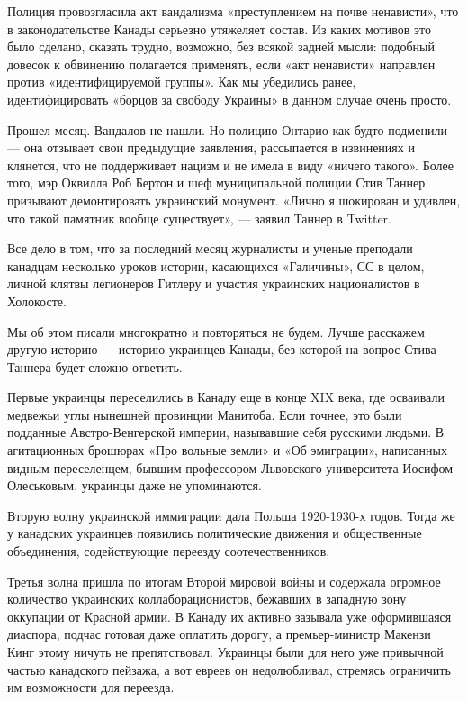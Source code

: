 Полиция провозгласила акт вандализма «преступлением на почве ненависти», что в
законодательстве Канады серьезно утяжеляет состав. Из каких мотивов это было
сделано, сказать трудно, возможно, без всякой задней мысли: подобный довесок к
обвинению полагается применять, если «акт ненависти» направлен против
«идентифицируемой группы». Как мы убедились ранее, идентифицировать «борцов за
свободу Украины» в данном случае очень просто.

Прошел месяц. Вандалов не нашли. Но полицию Онтарио как будто подменили --- она
отзывает свои предыдущие заявления, рассыпается в извинениях и клянется, что не
поддерживает нацизм и не имела в виду «ничего такого». Более того, мэр Оквилла
Роб Бертон и шеф муниципальной полиции Стив Таннер призывают демонтировать
украинский монумент. «Лично я шокирован и удивлен, что такой памятник вообще
существует», --- заявил Таннер в Twitter.

Все дело в том, что за последний месяц журналисты и ученые преподали канадцам
несколько уроков истории, касающихся «Галичины», СС в целом, личной клятвы
легионеров Гитлеру и участия украинских националистов в Холокосте.

Мы об этом писали многократно и повторяться не будем. Лучше расскажем другую
историю --- историю украинцев Канады, без которой на вопрос Стива Таннера будет
сложно ответить.

Первые украинцы переселились в Канаду еще в конце XIX века, где осваивали
медвежьи углы нынешней провинции Манитоба. Если точнее, это были подданные
Австро-Венгерской империи, называвшие себя русскими людьми. В агитационных
брошюрах «Про вольные земли» и «Об эмиграции», написанных видным переселенцем,
бывшим профессором Львовского университета Иосифом Олеськовым, украинцы даже не
упоминаются.

Вторую волну украинской иммиграции дала Польша 1920-1930-х годов. Тогда же у
канадских украинцев появились политические движения и общественные объединения,
содействующие переезду соотечественников.

Третья волна пришла по итогам Второй мировой войны и содержала огромное
количество украинских коллаборационистов, бежавших в западную зону оккупации от
Красной армии. В Канаду их активно зазывала уже оформившаяся диаспора, подчас
готовая даже оплатить дорогу, а премьер-министр Макензи Кинг этому ничуть не
препятствовал. Украинцы были для него уже привычной частью канадского пейзажа,
а вот евреев он недолюбливал, стремясь ограничить им возможности для переезда.

